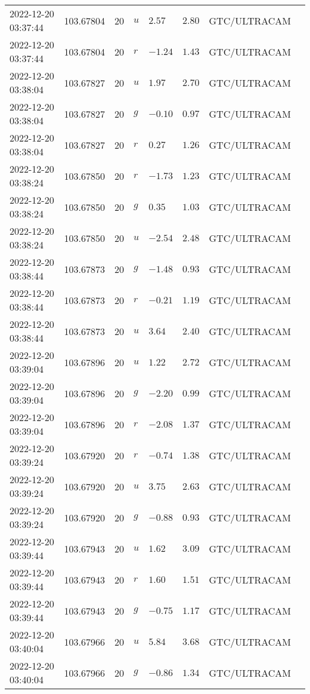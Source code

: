 \documentclass{nature_plusfigure}
\begin{document}
\begin{supplement}
\begin{center}
\begin{longtable}{llllllll}
2022-12-20 03:37:44 & 103.67804 & 20 & $u$ & $2.57$ & $2.80$ & GTC/ULTRACAM &  \\ 
2022-12-20 03:37:44 & 103.67804 & 20 & $r$ & $-1.24$ & $1.43$ & GTC/ULTRACAM &  \\ 
2022-12-20 03:38:04 & 103.67827 & 20 & $u$ & $1.97$ & $2.70$ & GTC/ULTRACAM &  \\ 
2022-12-20 03:38:04 & 103.67827 & 20 & $g$ & $-0.10$ & $0.97$ & GTC/ULTRACAM &  \\ 
2022-12-20 03:38:04 & 103.67827 & 20 & $r$ & $0.27$ & $1.26$ & GTC/ULTRACAM &  \\ 
2022-12-20 03:38:24 & 103.67850 & 20 & $r$ & $-1.73$ & $1.23$ & GTC/ULTRACAM &  \\ 
2022-12-20 03:38:24 & 103.67850 & 20 & $g$ & $0.35$ & $1.03$ & GTC/ULTRACAM &  \\ 
2022-12-20 03:38:24 & 103.67850 & 20 & $u$ & $-2.54$ & $2.48$ & GTC/ULTRACAM &  \\ 
2022-12-20 03:38:44 & 103.67873 & 20 & $g$ & $-1.48$ & $0.93$ & GTC/ULTRACAM &  \\ 
2022-12-20 03:38:44 & 103.67873 & 20 & $r$ & $-0.21$ & $1.19$ & GTC/ULTRACAM &  \\ 
2022-12-20 03:38:44 & 103.67873 & 20 & $u$ & $3.64$ & $2.40$ & GTC/ULTRACAM &  \\ 
2022-12-20 03:39:04 & 103.67896 & 20 & $u$ & $1.22$ & $2.72$ & GTC/ULTRACAM &  \\ 
2022-12-20 03:39:04 & 103.67896 & 20 & $g$ & $-2.20$ & $0.99$ & GTC/ULTRACAM &  \\ 
2022-12-20 03:39:04 & 103.67896 & 20 & $r$ & $-2.08$ & $1.37$ & GTC/ULTRACAM &  \\ 
2022-12-20 03:39:24 & 103.67920 & 20 & $r$ & $-0.74$ & $1.38$ & GTC/ULTRACAM &  \\ 
2022-12-20 03:39:24 & 103.67920 & 20 & $u$ & $3.75$ & $2.63$ & GTC/ULTRACAM &  \\ 
2022-12-20 03:39:24 & 103.67920 & 20 & $g$ & $-0.88$ & $0.93$ & GTC/ULTRACAM &  \\ 
2022-12-20 03:39:44 & 103.67943 & 20 & $u$ & $1.62$ & $3.09$ & GTC/ULTRACAM &  \\ 
2022-12-20 03:39:44 & 103.67943 & 20 & $r$ & $1.60$ & $1.51$ & GTC/ULTRACAM &  \\ 
2022-12-20 03:39:44 & 103.67943 & 20 & $g$ & $-0.75$ & $1.17$ & GTC/ULTRACAM &  \\ 
2022-12-20 03:40:04 & 103.67966 & 20 & $u$ & $5.84$ & $3.68$ & GTC/ULTRACAM &  \\ 
2022-12-20 03:40:04 & 103.67966 & 20 & $g$ & $-0.86$ & $1.34$ & GTC/ULTRACAM &  \\ 

\end{longtable}
\end{center}
\end{supplement}
\end{document}
